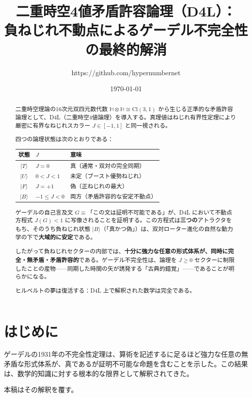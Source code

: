 \documentclass[dvipdfmx,11pt,a4paper]{article}
\title{二重時空4値矛盾許容論理（D4L）：\\
負ねじれ不動点によるゲーデル不完全性の最終的解消}
\author{https://github.com/hypernumbernet}
\date{\today}
\theoremstyle{definition}
\begin{document}
\maketitle

\begin{abstract}
二重時空理論の16次元双四元数代数 $\mathbb{H}\otimes\mathbb{H}\cong\mathrm{Cl}(3,1)$ から生じる正準的な矛盾許容論理として、D4L（二重時空4値論理）を導入する。真理値はねじれ有界性定理により厳密に有界なねじれスカラー $J\in[-1,1]$ と同一視される。

四つの論理状態は次のとおりである：
\begin{center}
\begin{tabular}{cll}
\toprule
状態 & $J$ & 意味 \\
\midrule
$\vert T\rangle$ & $J=0$ & 真（通常・双対の完全同期） \\
$\vert U\rangle$ & $0<J<1$ & 未定（ブースト優勢ねじれ） \\
$\vert F\rangle$ & $J=+1$ & 偽（正ねじれの最大） \\
$\vert B\rangle$ & $-1\leq J<0$ & 両方（矛盾許容的な安定不動点） \\
\bottomrule
\end{tabular}
\end{center}

ゲーデルの自己言及文 $G\equiv$「この文は証明不可能である」が、D4L において不動点方程式 $J(G)<1$ に写像されることを証明する。この方程式は\textbf{三つの}アトラクタをもち、そのうち負ねじれ状態 $\vert B\rangle$（「真かつ偽」）は、双対ローター進化の自然な動力学の下で\textbf{大域的に安定}である。

したがって負ねじれセクターの内部では、\textbf{十分に強力な任意の形式体系が、同時に完全・無矛盾・矛盾許容的}である。ゲーデル不完全性は、論理を $J\geq0$ セクターに制限したことの産物——同期した時間の矢が誘発する「古典的錯覚」——であることが明らかになる。

ヒルベルトの夢は復活する：D4L 上で解釈された数学は完全である。
\end{abstract}

\section{はじめに}

ゲーデルの1931年の不完全性定理は、算術を記述するに足るほど強力な任意の無矛盾な形式体系が、真であるが証明不可能な命題を含むことを示した。この結果は、数学的知識に対する根本的な限界として解釈されてきた。

本稿はその解釈を覆す。
\end{document}
